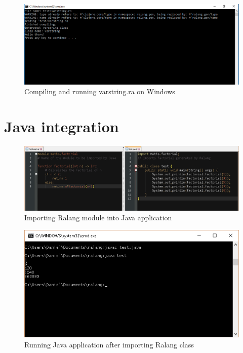\documentclass[a4paper]{article}
\begin{document}
\begin{appendices}
\begin{figure}[h!]
		\label{fig:windows_vars}
	\end{figure}
	\begin{figure}[h!]
		\centering
		\includegraphics[width=\linewidth]{images/windows_varstring.png}
		\caption[Compiling and running varstring.ra on Windows 10 32-bit]{Compiling and running varstring.ra on Windows}
		\label{fig:windows_varstring}
	\end{figure}
	\newpage
	\section{Java integration}
	\label{App:JavaIntegration}
	\begin{figure}[h!]
		\centering
		\includegraphics[width=\linewidth]{images/java_import_ralang.png}
		\caption{Importing Ralang module into Java application}
		\label{fig:ImportRalang}
	\end{figure}
	\begin{figure}[h!]
		\centering
		\includegraphics[width=\linewidth]{images/test_java_ralang.png}
		\caption{Running Java application after importing Ralang class}
		\label{fig:RunningJavaApp}
	\end{figure}
	\newpage

\end{appendices}
\end{document}
